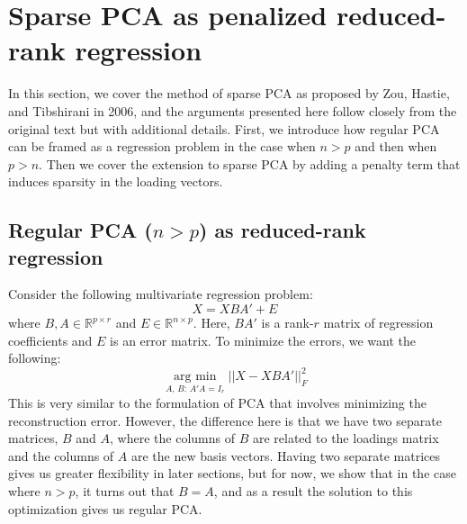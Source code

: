 \documentclass[11pt]{article}
\newcommand{\argmin}{\operatorname*{arg \ min}}
\begin{document}
\section{Sparse PCA as penalized reduced-rank regression}
In this section, we cover the method of sparse PCA as proposed by Zou, Hastie, and Tibshirani in 2006, and the arguments presented here follow closely from the original text but with additional details.  First, we introduce how regular PCA can be framed as a regression problem in the case when $n > p$ and then when $p > n$. Then we cover the extension to sparse PCA by adding a penalty term that induces sparsity in the loading vectors.

\subsection{Regular PCA ($n > p$) as reduced-rank regression}

Consider the following multivariate regression problem:
$$
X = XBA' + E
$$
where $B, A \in \mathbb{R}^{p \times r}$ and $E \in \mathbb{R}^{n \times p}$. Here, $BA'$ is a rank-$r$ matrix of regression coefficients and $E$ is an error matrix. To minimize the errors, we want the following:
\begin{equation*} \label{eqn:error}
\argmin_{A, \,B: \,A'A = I_r} ||X - XBA'||_F^2
\end{equation*}
This is very similar to the formulation of PCA that involves minimizing the reconstruction error. However, the difference here is that we have two separate matrices, $B$ and $A$, where the columns of $B$ are related to the loadings matrix and the columns of $A$ are the new basis vectors. Having two separate matrices gives us greater flexibility in later sections, but for now, we show that in the case where $n > p$, it turns out that $B = A$, and as a result the solution to this optimization gives us regular PCA.
\end{document}
